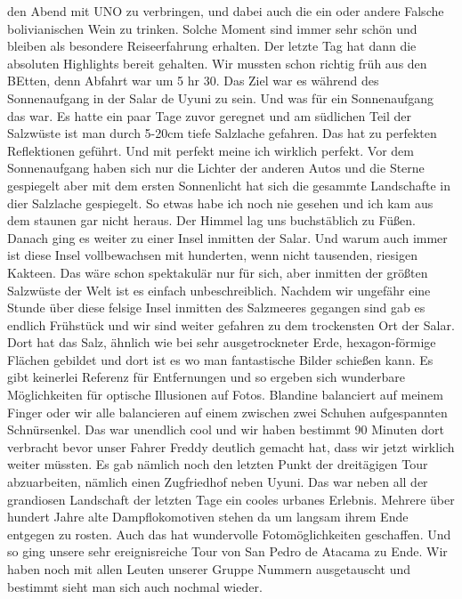 \documentclass[11pt]{book}
\begin{document}
den Abend mit UNO zu verbringen, und dabei auch die ein oder andere Falsche bolivianischen Wein zu trinken. Solche Moment sind immer sehr schön und 
bleiben als besondere Reiseerfahrung erhalten. 
Der letzte Tag hat dann die absoluten Highlights bereit gehalten. Wir mussten schon richtig früh aus den BEtten, denn Abfahrt war um 5 hr 30. Das Ziel 
war es während des Sonnenaufgang in der Salar de Uyuni zu sein. Und was für ein Sonnenaufgang das war. Es hatte ein paar Tage zuvor geregnet und am 
südlichen Teil der Salzwüste ist man durch 5-20cm tiefe Salzlache gefahren. Das hat zu perfekten Reflektionen geführt. Und mit perfekt meine ich wirklich 
perfekt. Vor dem Sonnenaufgang haben sich nur die Lichter der anderen Autos und die Sterne gespiegelt aber mit dem ersten Sonnenlicht hat sich die 
gesammte Landschafte in dier Salzlache gespiegelt. So etwas habe ich noch nie gesehen und ich kam aus dem staunen gar nicht heraus. Der Himmel lag uns 
buchstäblich zu Füßen. Danach ging es weiter zu einer Insel inmitten der Salar. Und warum auch immer ist diese Insel vollbewachsen mit hunderten, wenn 
nicht tausenden, riesigen Kakteen. Das wäre schon spektakulär nur für sich, aber inmitten der größten Salzwüste der Welt ist es einfach unbeschreiblich. 
Nachdem wir ungefähr eine Stunde über diese felsige Insel inmitten des Salzmeeres gegangen sind gab es endlich Frühstück und wir sind weiter gefahren 
zu dem trockensten Ort der Salar. Dort hat das Salz, ähnlich wie bei sehr ausgetrockneter Erde, hexagon-förmige Flächen gebildet und dort ist es 
wo man fantastische Bilder schießen kann. Es gibt keinerlei Referenz für Entfernungen und so ergeben sich wunderbare Möglichkeiten für optische 
Illusionen auf Fotos. Blandine balanciert auf meinem Finger oder wir alle balancieren auf einem zwischen zwei Schuhen aufgespannten Schnürsenkel. 
Das war unendlich cool und wir haben bestimmt 90 Minuten dort verbracht bevor unser Fahrer Freddy deutlich gemacht hat, dass wir jetzt wirklich weiter 
müssten. Es gab nämlich noch den letzten Punkt der dreitägigen Tour abzuarbeiten, nämlich einen Zugfriedhof neben Uyuni. Das war neben all der grandiosen 
Landschaft der letzten Tage ein cooles urbanes Erlebnis. Mehrere über hundert Jahre alte Dampflokomotiven stehen da um langsam ihrem Ende entgegen zu 
rosten. Auch das hat wundervolle Fotomöglichkeiten geschaffen. Und so ging unsere sehr ereignisreiche Tour von San Pedro de Atacama zu Ende. Wir haben noch 
mit allen Leuten unserer Gruppe Nummern ausgetauscht und bestimmt sieht man sich auch nochmal wieder.
\end{document}
